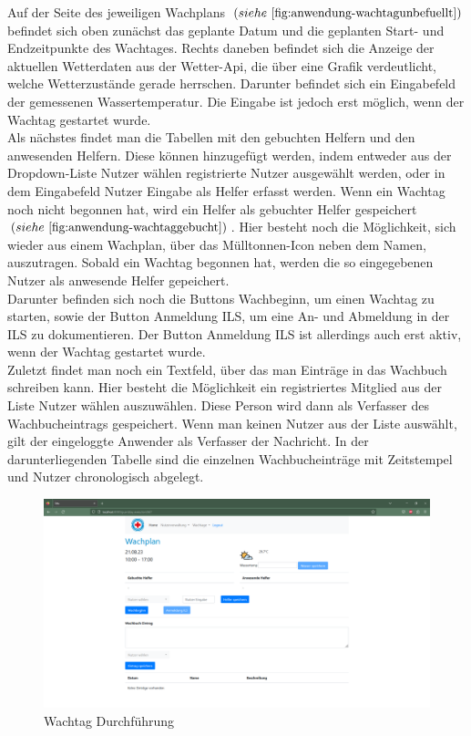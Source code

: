 \documentclass[fontsize=12pt,openright,oneside,paper=a4,BCOR=1cm]{scrbook}
\begin{document}
Auf der Seite des jeweiligen Wachplans $(siehe~\ref{fig:anwendung-wachtagunbefuellt})$ befindet sich oben zun\"achst das geplante Datum und die geplanten Start- und Endzeitpunkte des Wachtages. Rechts daneben befindet sich die Anzeige der aktuellen Wetterdaten aus der Wetter-Api, die \"uber eine Grafik verdeutlicht, welche Wetterzust\"ande gerade herrschen. Darunter befindet sich ein Eingabefeld der gemessenen Wassertemperatur. Die Eingabe ist jedoch erst m\"oglich, wenn der Wachtag gestartet wurde. \\
Als n\"achstes findet man die Tabellen mit den gebuchten Helfern und den anwesenden Helfern. Diese k\"onnen hinzugef\"ugt werden, indem entweder aus der Dropdown-Liste \glqq Nutzer w\"ahlen\grqq{} registrierte Nutzer ausgew\"ahlt werden, oder in dem Eingabefeld \glqq Nutzer Eingabe\grqq{} als Helfer erfasst werden. Wenn ein Wachtag noch nicht begonnen hat, wird ein Helfer als gebuchter Helfer gespeichert $(siehe~\ref{fig:anwendung-wachtaggebucht})$. Hier besteht noch die M\"oglichkeit, sich wieder aus einem Wachplan, \"uber das M\"ulltonnen-Icon neben dem Namen, auszutragen. Sobald ein Wachtag begonnen hat, werden die so eingegebenen Nutzer als anwesende Helfer gepeichert. \\
Darunter befinden sich noch die Buttons \glqq Wachbeginn\grqq{}, um einen Wachtag zu starten, sowie der Button \glqq Anmeldung ILS\grqq{}, um eine An- und Abmeldung in der ILS zu dokumentieren. Der Button \glqq Anmeldung ILS\grqq{} ist allerdings auch erst aktiv, wenn der Wachtag gestartet wurde. \\
Zuletzt findet man noch ein Textfeld, \"uber das man Eintr\"age in das Wachbuch schreiben kann. Hier besteht die M\"oglichkeit ein registriertes Mitglied aus der Liste \glqq Nutzer w\"ahlen\grqq{} auszuw\"ahlen. Diese Person wird dann als Verfasser des Wachbucheintrags gespeichert. Wenn man keinen Nutzer aus der Liste ausw\"ahlt, gilt der eingeloggte Anwender als Verfasser der Nachricht. In der darunterliegenden Tabelle sind die einzelnen Wachbucheintr\"age mit Zeitstempel und Nutzer chronologisch abgelegt.

\begin{figure}[H]
  \centering
    \includegraphics[width=0.8\linewidth]{Anlagen/Anwendung/8WachtagUnbefuellt.png}
    \caption{Wachtag Durchf\"uhrung}
  \label{fig:anwendung-wachtagunbefuellt}
\end{figure}
\end{document}
